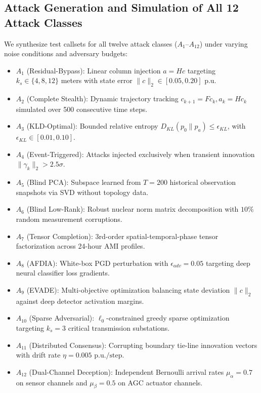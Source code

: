 \documentclass[journal,compsoc]{IEEEtran}
\begin{document}
\subsection{Attack Generation and Simulation of All 12 Attack Classes}
We synthesize test callsets for all twelve attack classes ($A_1$--$A_{12}$) under varying noise conditions and adversary budgets:
\begin{itemize}
    \item $A_1$ (Residual-Bypass): Linear column injection $a = Hc$ targeting $k_s \in \{4, 8, 12\}$ meters with state error $\|c\|_2 \in [0.05, 0.20]\text{ p.u.}$
    \item $A_2$ (Complete Stealth): Dynamic trajectory tracking $c_{k+1} = F c_k, a_k = H c_k$ simulated over 500 consecutive time steps.
    \item $A_3$ (KLD-Optimal): Bounded relative entropy $D_{KL}(p_0 \parallel p_a) \le \epsilon_{KL}$, with $\epsilon_{KL} \in [0.01, 0.10]$.
    \item $A_4$ (Event-Triggered): Attacks injected exclusively when transient innovation $\|\gamma_k\|_2 > 2.5\sigma$.
    \item $A_5$ (Blind PCA): Subspace learned from $T = 200$ historical observation snapshots via SVD without topology data.
    \item $A_6$ (Blind Low-Rank): Robust nuclear norm matrix decomposition with $10\%$ random measurement corruptions.
    \item $A_7$ (Tensor Completion): 3rd-order spatial-temporal-phase tensor factorization across 24-hour AMI profiles.
    \item $A_8$ (AFDIA): White-box PGD perturbation with $\epsilon_{adv} = 0.05$ targeting deep neural classifier loss gradients.
    \item $A_9$ (EVADE): Multi-objective optimization balancing state deviation $\|c\|_2$ against deep detector activation margins.
    \item $A_{10}$ (Sparse Adversarial): $\ell_0$-constrained greedy sparse optimization targeting $k_s = 3$ critical transmission substations.
    \item $A_{11}$ (Distributed Consensus): Corrupting boundary tie-line innovation vectors with drift rate $\eta = 0.005\text{ p.u./step}$.
    \item $A_{12}$ (Dual-Channel Deception): Independent Bernoulli arrival rates $\mu_\alpha = 0.7$ on sensor channels and $\mu_\beta = 0.5$ on AGC actuator channels.
\end{itemize}
\end{document}
